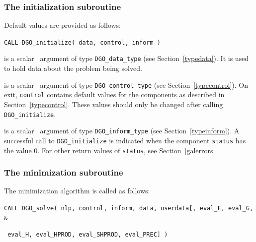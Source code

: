 \documentclass{galahad}
\newcommand{\packagename}{DGO}
\begin{document}

\subsubsection{The initialization subroutine}\label{subinit}
 Default values are provided as follows:
\vspace*{1mm}

\hspace{8mm}
{\tt CALL \packagename\_initialize( data, control, inform )}

\vspace*{-2mm}
\begin{description}

 is a scalar \intentinout\ argument of type
{\tt \packagename\_data\_type}
(see Section~\ref{typedata}). It is used to hold data about the problem being
solved.

 is a scalar \intentout\ argument of type
{\tt \packagename\_control\_type}
(see Section~\ref{typecontrol}).
On exit, {\tt control} contains default values for the components as
described in Section~\ref{typecontrol}.
These values should only be changed after calling
{\tt \packagename\_initialize}.

 is a scalar \intentout\ argument of type
{\tt \packagename\_inform\_type}
(see Section~\ref{typeinform}). A successful call to
{\tt \packagename\_initialize}
is indicated when the  component {\tt status} has the value 0.
For other return values of {\tt status}, see Section~\ref{galerrors}.

\end{description}


\subsubsection{The minimization subroutine}
The minimization algorithm is called as follows:
\vspace*{1mm}

\hspace{8mm}
{\tt CALL \packagename\_solve( nlp, control, inform, data, userdata[, eval\_F,
eval\_G, \hspace{8mm}                  \&}
\vspace*{-1mm}

\hspace{37mm}
{\tt
eval\_H,  eval\_HPROD, eval\_SHPROD, eval\_PREC] )}
\end{document}
